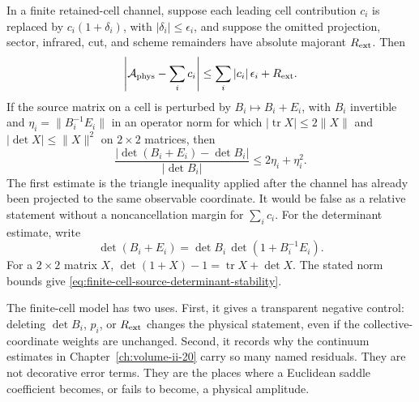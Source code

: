 \begin{controlledapproximation}
\label{ca:finite-cell-instanton-channel-control}
In a finite retained-cell channel, suppose each leading cell contribution
\(c_i\) is replaced by \(c_i(1+\delta_i)\), with
\(|\delta_i|\le\epsilon_i\), and suppose the omitted projection, sector,
infrared, cut, and scheme remainders have absolute majorant \(R_{\rm ext}\).
Then
\begin{equation}
  \left|
  \mathcal A_{\rm phys}
  -\sum_i c_i
  \right|
  \le
  \sum_i |c_i|\,\epsilon_i+R_{\rm ext}.
  \label{eq:finite-cell-instanton-channel-bound}
\end{equation}
If the source matrix on a cell is perturbed by
\(B_i\mapsto B_i+E_i\), with \(B_i\) invertible and
\(\eta_i=\|B_i^{-1}E_i\|\) in an operator norm for which
\(|\operatorname{tr}X|\le2\|X\|\) and \(|\det X|\le\|X\|^2\) on
\(2\times2\) matrices, then
\begin{equation}
  \frac{|\det(B_i+E_i)-\det B_i|}{|\det B_i|}
  \le
  2\eta_i+\eta_i^2 .
  \label{eq:finite-cell-source-determinant-stability}
\end{equation}
The first estimate is the triangle inequality applied after the channel has
already been projected to the same observable coordinate.  It would be false
as a relative statement without a noncancellation margin for
\(\sum_i c_i\).  For the determinant estimate, write
\[
  \det(B_i+E_i)=\det B_i\,
  \det(1+B_i^{-1}E_i).
\]
For a \(2\times2\) matrix \(X\),
\(\det(1+X)-1=\operatorname{tr}X+\det X\).  The stated norm bounds give
\eqref{eq:finite-cell-source-determinant-stability}.
\end{controlledapproximation}

The finite-cell model has two uses.  First, it gives a transparent negative
control: deleting \(\det B_i\), \(p_i\), or \(R_{\rm ext}\) changes the
physical statement, even if the collective-coordinate weights are unchanged.
Second, it records why the continuum estimates in
Chapter~\ref{ch:volume-ii-20} carry so many named residuals.  They
are not decorative error terms.  They are the places where a Euclidean saddle
coefficient becomes, or fails to become, a physical amplitude.
